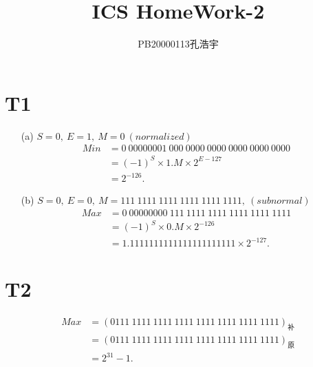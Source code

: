 \documentclass{article}
\title{ICS  HomeWork-2}
\author{PB20000113孔浩宇}
\begin{document}
\maketitle
\section*{T1}
    \begin{enumerate}
        \item [(a)]$S=0,\ E=1,\ M=0\ (normalized)$
        \begin{align*}
            Min
            &=0\ 0000 0001\  000\ 0000\ 0000\ 0000\ 0000\ 0000\\
            &={(-1)}^{S}\times 1.M\times 2^{E-127}\\
            &=2^{-126}.
        \end{align*}
        \item [(b)]$S=0,\ E=0,\ M=111\ 1111\ 1111\ 1111\ 1111\ 1111,\ (subnormal)$
        \begin{align*}
            Max
            &=0\ 0000 0000\ 111\ 1111\ 1111\ 1111\ 1111\ 1111\\
            &={(-1)}^{S}\times 0.M \times 2^{-126}\\
            &=1.1111111111111111111111\times 2^{-127}.
        \end{align*}
    \end{enumerate}

\section*{T2}
\begin{align*}
    Max
    &={(0111\ 1111\ 1111\ 1111\ 1111\ 1111\ 1111\ 1111)}_{\mbox{补}}\\
    &={(0111\ 1111\ 1111\ 1111\ 1111\ 1111\ 1111\ 1111)}_{\mbox{原}}\\
    &=2^{31}-1.
\end{align*}
\end{document}

